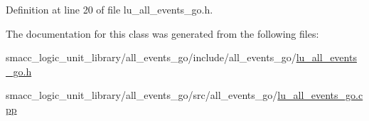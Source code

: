 Definition at line 20 of file lu\+\_\+all\+\_\+events\+\_\+go.\+h.



The documentation for this class was generated from the following files\+:\begin{DoxyCompactItemize}
\item 
smacc\+\_\+logic\+\_\+unit\+\_\+library/all\+\_\+events\+\_\+go/include/all\+\_\+events\+\_\+go/\hyperlink{lu__all__events__go_8h}{lu\+\_\+all\+\_\+events\+\_\+go.\+h}\item 
smacc\+\_\+logic\+\_\+unit\+\_\+library/all\+\_\+events\+\_\+go/src/all\+\_\+events\+\_\+go/\hyperlink{lu__all__events__go_8cpp}{lu\+\_\+all\+\_\+events\+\_\+go.\+cpp}\end{DoxyCompactItemize}
